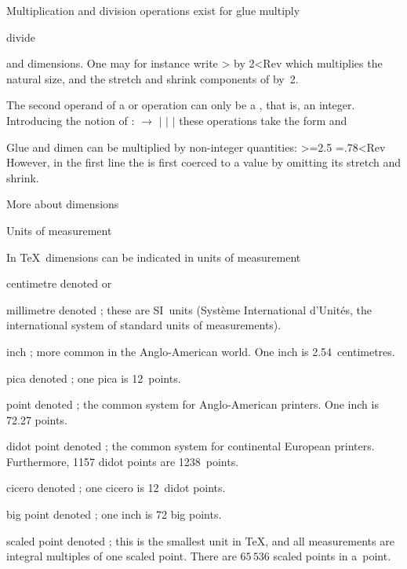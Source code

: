Multiplication and division operations exist for glue
\csterm multiply\par\csterm divide\par
and dimensions. One may for instance write
\Ver>\multiply{} by 2<Rev
which multiplies the natural size, and the stretch and shrink
components of  by~2.

The second operand of a  or 
operation can only be a , that is, an integer.
Introducing the notion of :
\disp{} $\longrightarrow$ 
     $|$  \nl
     \indent $|$  $|$ \dispstop
these operations take the form
\Disp{}%
\Dispstop 
and
\Disp{}%
\Dispstop

Glue and dimen can be multiplied by 
non-integer quantities:
\Ver>=2.5
=.78<Rev
However, in the first line the  is first coerced
to a  value by omitting its stretch and shrink.

\point More about dimensions

\spoint Units of measurement

In \TeX\ dimensions can be indicated in
\term units of measurement\par
\description \item centimetre
    denoted  or 
\item millimetre
	denoted ; these are SI~units ({\italic Syst\`eme International
	d'Unit\'es}, the
	international system of standard units of measurements).
\item inch
; more common in the Anglo-American world.
One inch is 2.54~centimetres.
\item pica
    denoted ; one pica is 12~points.
\item point
    denoted ; the common system
for Anglo-American printers. One inch is 72.27 points.
\item didot point
    denoted ; the common system for continental European printers.
    Furthermore, 1157 didot points are 1238~points.
\item cicero
    denoted ; one cicero is 12~didot points.
\item big point
    denoted ; one inch is 72 big points.
\item scaled point
    denoted ; this is the smallest unit in \TeX, and all measurements
    are integral multiples of one scaled point.
    There are $65\,536$ scaled points in a~point.
\descriptionstop

